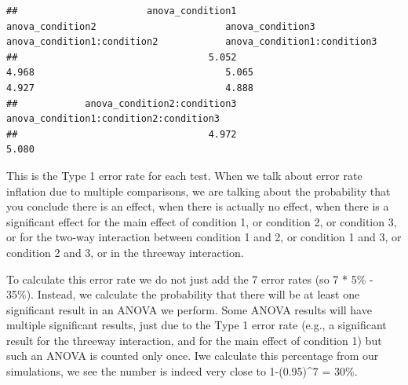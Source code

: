 \documentclass[]{article}
\newenvironment{Shaded}{\begin{snugshade}}{\end{snugshade}}
\newcommand{\KeywordTok}[1]{\textcolor[rgb]{0.13,0.29,0.53}{\textbf{#1}}}
\newcommand{\DecValTok}[1]{\textcolor[rgb]{0.00,0.00,0.81}{#1}}
\newcommand{\StringTok}[1]{\textcolor[rgb]{0.31,0.60,0.02}{#1}}
\newcommand{\ControlFlowTok}[1]{\textcolor[rgb]{0.13,0.29,0.53}{\textbf{#1}}}
\newcommand{\OperatorTok}[1]{\textcolor[rgb]{0.81,0.36,0.00}{\textbf{#1}}}
\newcommand{\NormalTok}[1]{#1}
\begin{document}
\begin{Shaded}
\end{Shaded}

\begin{verbatim}
##                       anova_condition1                       anova_condition2                       anova_condition3            anova_condition1:condition2            anova_condition1:condition3 
##                                  5.052                                  4.968                                  5.065                                  4.927                                  4.888 
##            anova_condition2:condition3 anova_condition1:condition2:condition3 
##                                  4.972                                  5.080
\end{verbatim}

This is the Type 1 error rate for each test. When we talk about error
rate inflation due to multiple comparisons, we are talking about the
probability that you conclude there is an effect, when there is actually
no effect, when there is a significant effect for the main effect of
condition 1, or condition 2, or condition 3, or for the two-way
interaction between condition 1 and 2, or condition 1 and 3, or
condition 2 and 3, or in the threeway interaction.

To calculate this error rate we do not just add the 7 error rates (so 7
* 5\% - 35\%). Instead, we calculate the probability that there will be
at least one significant result in an ANOVA we perform. Some ANOVA
results will have multiple significant results, just due to the Type 1
error rate (e.g., a significant result for the threeway interaction, and
for the main effect of condition 1) but such an ANOVA is counted only
once. Iwe calculate this percentage from our simulations, we see the
number is indeed very close to 1-(0.95)\^{}7 = 30\%.
\end{document}
